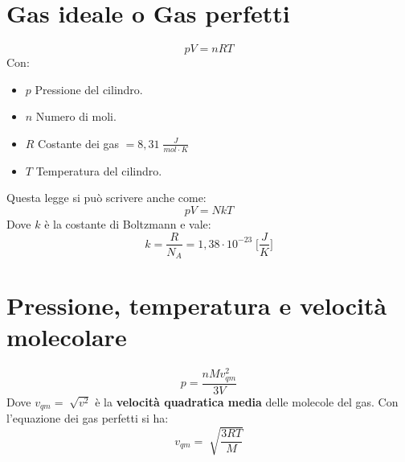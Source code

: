     \section*{Gas ideale o Gas perfetti} 
        \begin{equation*}
            pV = nRT
        \end{equation*}
    Con:
        \begin{itemize}
            \item $p$ Pressione del cilindro.
            \item $n$ Numero di moli.
            \item $R$ Costante dei gas $= 8,31 \; \frac{J}{mol \cdot K}$
            \item $T$ Temperatura del cilindro.
        \end{itemize}
    Questa legge si può scrivere anche come:
        \begin{equation*}
            pV = NkT
        \end{equation*}
    Dove $k$ è la costante di Boltzmann e vale:
        \begin{equation*}
            k = \frac{R}{N_A} = 1,38 \cdot 10^{-23} \; \Bigg[\frac{J}{K}\Bigg]
        \end{equation*}

    \section*{Pressione, temperatura e velocità molecolare}
            \begin{equation*}
                p = \frac{nMv^2_{qm}}{3V}
            \end{equation*}
    Dove $v_{qm} = \sqrt[]{v^2}$ è la \textbf{velocità quadratica media} delle
    molecole del gas. Con l'equazione dei gas perfetti si ha:
            \begin{equation*}
                v_{qm} = \sqrt[]{\frac{3RT}{M}}
            \end{equation*}